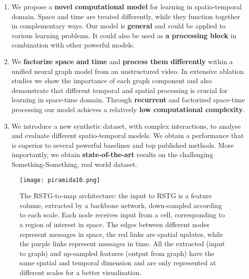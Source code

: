 \documentclass{article}
\begin{document}
\begin{enumerate}
    \item We propose a \textbf{novel computational model} for learning in spatio-temporal domain. Space and time are treated differently, while they function together in complementary ways. Our model is \textbf{general} and could be applied to various learning problems. It could also be used as \textbf{a processing block} in combination with other powerful models.

    \item We \textbf{factorize space and time} and \textbf{process them differently} within a unified neural graph model from an unstructured video. In extensive ablation studies we show the importance of each graph component and also demonstrate that different temporal and spatial processing is crucial for learning in space-time domain. Through \textbf{recurrent} and factorized space-time processing
    our model achieves a relatively \textbf{low computational complexity}. 
    
    \item We introduce a new synthetic dataset, with complex interactions, to analyse and evaluate different spatio-temporal models. We obtain a performance that is superior to several powerful baselines and top published methods. More importantly, we obtain \textbf{state-of-the-art} results on the challenging Something-Something, real world dataset.
    
\end{enumerate}

\begin{figure}[t!]
\begin{center}
\centerline{\texttt{[image: piramida10.png]}}
\caption{The RSTG-to-map architecture: the input to RSTG is a feature volume, extracted by a backbone network, down-sampled according to each scale. Each node receives input from a cell, corresponding to a region of interest in space. The edges between different nodes represent messages in space, the red links are spatial updates, while the purple links represent messages in time. All the extracted (input to graph) and up-sampled features (output from graph) have the same spatial and temporal dimension  and are only represented at different scales for a better visualisation.}
\label{fig:main_graph_figure}
\end{center}
\vskip -0.2in
\end{figure}
\end{document}
